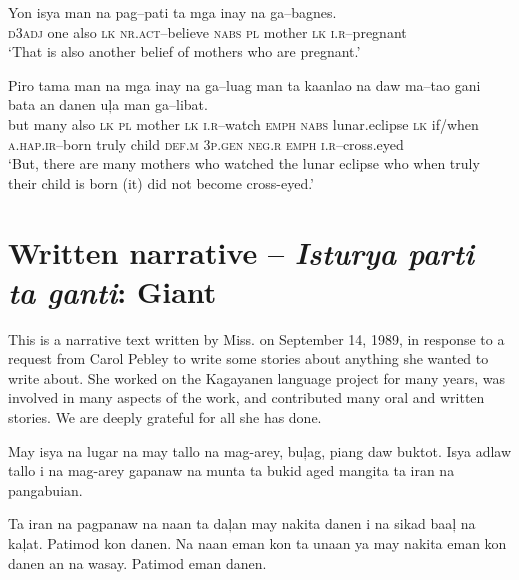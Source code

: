\ea
\gll Yon  isya  man  na  pag--pati    ta  mga  inay  na  ga--bagnes. \\
\textsc{d3adj}  one  also  \textsc{lk}  \textsc{nr.act--}believe  \textsc{nabs}  \textsc{pl}  mother  \textsc{lk}  \textsc{i.r}--pregnant \\
\glt ‘That is also another belief of mothers who are pregnant.’
\z

\ea          %
\gll Piro  tama  man  na  mga  inay  na  ga--luag  man  ta  kaanlao   na  daw  ma--tao  gani  bata  an  danen  u\c{l}a   man  ga--libat.\\
but  many  also  \textsc{lk}  \textsc{pl}  mother  \textsc{lk}  \textsc{i.r}--watch  \textsc{emph}  \textsc{nabs}  lunar.eclipse
\textsc{lk}  if/when  \textsc{a.hap.ir}--born  truly  child  \textsc{def.m}  3\textsc{p.gen}  \textsc{neg.r}
\textsc{emph}  \textsc{i.r}--cross.eyed \\
\glt ‘But, there are many mothers who watched the lunar eclipse who when truly their child is born (it) did not become cross-eyed.’
\z

\setcounter{equation}{0}
\section{Written narrative -- \textit{Isturya parti ta ganti}: Giant}

This is a narrative text written by Miss.  on September 14, 1989, in response to a request from Carol Pebley to write some stories about anything she wanted to write about. She worked on the Kagayanen language project for many years, was involved in many aspects of the work, and contributed many oral and written stories. We are deeply grateful for all she has done.\bigskip



May isya na lugar na may tallo na mag-arey, bu\c{l}ag, piang daw buktot. Isya adlaw tallo i na mag-arey gapanaw na munta ta bukid aged mangita ta iran na pangabuian.

Ta iran na pagpanaw na naan ta da\c{l}an may nakita danen i na sikad baa\c{l} na ka\c{l}at. Patimod kon danen. Na naan eman kon ta unaan ya may nakita eman kon danen an na wasay. Patimod eman danen.

